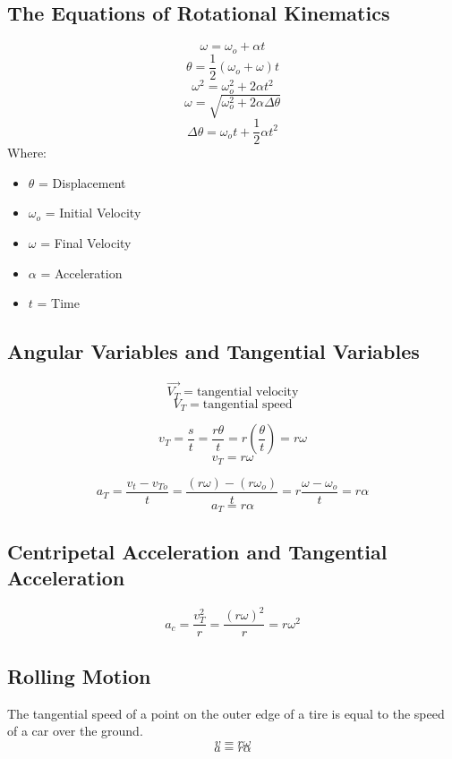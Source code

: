 \subsection{The Equations of Rotational Kinematics}
\[\omega=\omega_o+\alpha t\]
\[\theta=\frac{1}{2}(\omega_o+\omega)t\]
\[\omega^2=\omega^2_o+2\alpha t^2\]
\[\omega = \sqrt{\omega^2_o + 2 \alpha\Delta\theta}\]
\[\Delta \theta=\omega_o t+\frac{1}{2}\alpha t^2\]
Where: \begin{itemize}
	\item $\theta$ = Displacement
	\item $\omega_o$ = Initial Velocity
	\item $\omega$ = Final Velocity
	\item $\alpha$ = Acceleration
	\item $t$ = Time
\end{itemize}

\subsection{Angular Variables and Tangential Variables}
\[\overrightarrow{V_T} = \text{tangential velocity}\]
\[V_T = \text{tangential speed}\]

\[v_T=\frac{s}{t}=\frac{r\theta}{t}=r\left(\frac{\theta}{t}\right)=r\omega\]
\[v_T=r\omega\]

\[a_T=\frac{v_t-v_{To}}{t}=\frac{(r\omega)-(r\omega_o)}{t}=r\frac{\omega-\omega_o}{t}=r\alpha\]
\[a_T=r\alpha\]

\subsection{Centripetal Acceleration and Tangential Acceleration}
\[a_c=\frac{v^2_T}{r}=\frac{(r\omega)^2}{r}=r\omega^2\]

\subsection{Rolling Motion}
The tangential speed of a point on the outer edge of a tire is equal to the speed of a car over the ground. 
\[v=r\omega\]
\[a=r\alpha\]




















